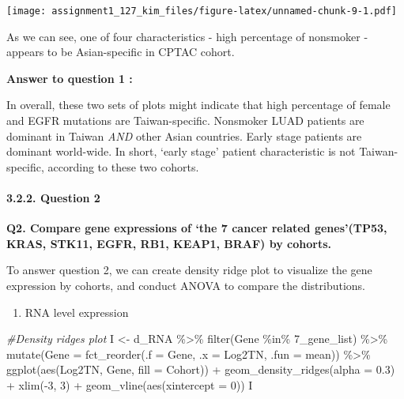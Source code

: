 \documentclass[
]{article}
\newenvironment{Shaded}{\begin{snugshade}}{\end{snugshade}}
\newcommand{\AttributeTok}[1]{\textcolor[rgb]{0.77,0.63,0.00}{#1}}
\newcommand{\CommentTok}[1]{\textcolor[rgb]{0.56,0.35,0.01}{\textit{#1}}}
\newcommand{\DecValTok}[1]{\textcolor[rgb]{0.00,0.00,0.81}{#1}}
\newcommand{\FloatTok}[1]{\textcolor[rgb]{0.00,0.00,0.81}{#1}}
\newcommand{\FunctionTok}[1]{\textcolor[rgb]{0.00,0.00,0.00}{#1}}
\newcommand{\NormalTok}[1]{#1}
\newcommand{\OtherTok}[1]{\textcolor[rgb]{0.56,0.35,0.01}{#1}}
\newcommand{\SpecialCharTok}[1]{\textcolor[rgb]{0.00,0.00,0.00}{#1}}
\newcommand{\StringTok}[1]{\textcolor[rgb]{0.31,0.60,0.02}{#1}}
\providecommand{\tightlist}{%
  \setlength{\itemsep}{0pt}\setlength{\parskip}{0pt}}
\begin{document}
\texttt{[image: assignment1\_127\_kim\_files/figure-latex/unnamed-chunk-9-1.pdf]}

As we can see, one of four characteristics - high percentage of
nonsmoker - appears to be Asian-specific in CPTAC cohort.

\textbf{Answer to question 1 :}

In overall, these two sets of plots might indicate that high percentage
of female and EGFR mutations are Taiwan-specific. Nonsmoker LUAD
patients are dominant in Taiwan \emph{AND} other Asian countries. Early
stage patients are dominant world-wide. In short, `early stage' patient
characteristic is not Taiwan-specific, according to these two cohorts.

\hypertarget{question-2}{%
\paragraph{3.2.2. Question 2}\label{question-2}}

\textbf{Q2. Compare gene expressions of `the 7 cancer related
genes'(TP53, KRAS, STK11, EGFR, RB1, KEAP1, BRAF) by cohorts.}

To answer question 2, we can create density ridge plot to visualize the
gene expression by cohorts, and conduct ANOVA to compare the
distributions.

\begin{enumerate}
\def\labelenumi{\arabic{enumi})}
\tightlist
\item
  RNA level expression
\end{enumerate}

\begin{Shaded}
\begin{Highlighting}[]
\CommentTok{\#Density ridges plot}
\NormalTok{I }\OtherTok{\textless{}{-}}\NormalTok{ d\_RNA }\SpecialCharTok{\%\textgreater{}\%} 
  \FunctionTok{filter}\NormalTok{(Gene }\SpecialCharTok{\%in\%} \StringTok{\textasciigrave{}}\AttributeTok{7\_gene\_list}\StringTok{\textasciigrave{}}\NormalTok{) }\SpecialCharTok{\%\textgreater{}\%}
  \FunctionTok{mutate}\NormalTok{(}\AttributeTok{Gene =} \FunctionTok{fct\_reorder}\NormalTok{(}\AttributeTok{.f =}\NormalTok{ Gene, }\AttributeTok{.x =}\NormalTok{ Log2TN, }\AttributeTok{.fun =}\NormalTok{ mean)) }\SpecialCharTok{\%\textgreater{}\%}
  \FunctionTok{ggplot}\NormalTok{(}\FunctionTok{aes}\NormalTok{(Log2TN, Gene, }\AttributeTok{fill =}\NormalTok{ Cohort)) }\SpecialCharTok{+}
  \FunctionTok{geom\_density\_ridges}\NormalTok{(}\AttributeTok{alpha =} \FloatTok{0.3}\NormalTok{) }\SpecialCharTok{+}
  \FunctionTok{xlim}\NormalTok{(}\SpecialCharTok{{-}}\DecValTok{3}\NormalTok{, }\DecValTok{3}\NormalTok{) }\SpecialCharTok{+}
  \FunctionTok{geom\_vline}\NormalTok{(}\FunctionTok{aes}\NormalTok{(}\AttributeTok{xintercept =} \DecValTok{0}\NormalTok{))}
\NormalTok{I}
\end{Highlighting}
\end{Shaded}
\end{document}
